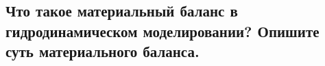 

\subsection{Что такое материальный баланс в гидродинамическом моделировании? Опишите суть материального баланса.}


